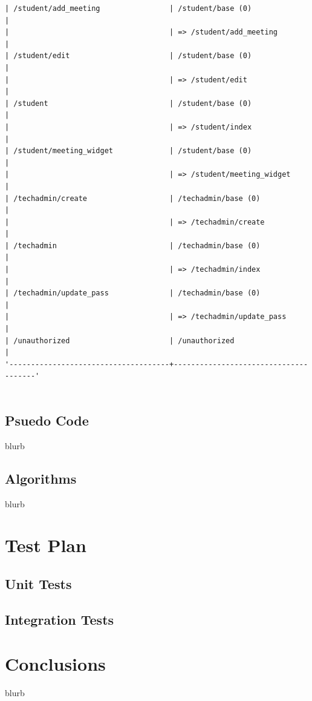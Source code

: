 \documentclass{journal}
\begin{document}
\begin{verbatim}
| /student/add_meeting                | /student/base (0)                    |
|                                     | => /student/add_meeting              |
| /student/edit                       | /student/base (0)                    |
|                                     | => /student/edit                     |
| /student                            | /student/base (0)                    |
|                                     | => /student/index                    |
| /student/meeting_widget             | /student/base (0)                    |
|                                     | => /student/meeting_widget           |
| /techadmin/create                   | /techadmin/base (0)                  |
|                                     | => /techadmin/create                 |
| /techadmin                          | /techadmin/base (0)                  |
|                                     | => /techadmin/index                  |
| /techadmin/update_pass              | /techadmin/base (0)                  |
|                                     | => /techadmin/update_pass            |
| /unauthorized                       | /unauthorized                        |
'-------------------------------------+--------------------------------------'


\end{verbatim}

\subsection{Psuedo Code}
blurb
\subsection{Algorithms}
blurb 
\section{Test Plan}

\subsection{Unit Tests}

\subsection{Integration Tests}


\section{Conclusions}
blurb 
\end{document}
